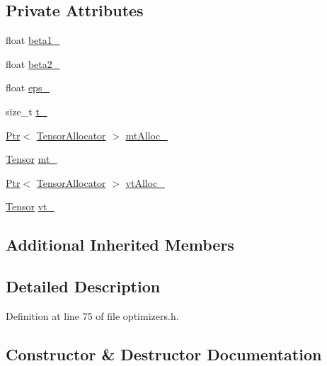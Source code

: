 \subsection*{Private Attributes}
\begin{DoxyCompactItemize}
\item 
float \hyperlink{classmarian_1_1Adam_af3fd471705356247190b1bb4479b8caa}{beta1\+\_\+}
\item 
float \hyperlink{classmarian_1_1Adam_ab9500202203fe54509a1dd1af86f8e22}{beta2\+\_\+}
\item 
float \hyperlink{classmarian_1_1Adam_a95c21e42ab91a2b6631702a470a1af81}{eps\+\_\+}
\item 
size\+\_\+t \hyperlink{classmarian_1_1Adam_ad51e47f4b687f5df04dedb1222559e9d}{t\+\_\+}
\item 
\hyperlink{namespacemarian_ad1a373be43a00ef9ce35666145137b08}{Ptr}$<$ \hyperlink{classmarian_1_1TensorAllocator}{Tensor\+Allocator} $>$ \hyperlink{classmarian_1_1Adam_a148b6411057a10ca625e4cff3c9f893c}{mt\+Alloc\+\_\+}
\item 
\hyperlink{namespacemarian_a88b71ec34bb354564cddc24eb80f7e14}{Tensor} \hyperlink{classmarian_1_1Adam_a5af2c6b526ebd34160a6c253ff03ac75}{mt\+\_\+}
\item 
\hyperlink{namespacemarian_ad1a373be43a00ef9ce35666145137b08}{Ptr}$<$ \hyperlink{classmarian_1_1TensorAllocator}{Tensor\+Allocator} $>$ \hyperlink{classmarian_1_1Adam_a81c15958e30a106cf010d3b6e76f3b19}{vt\+Alloc\+\_\+}
\item 
\hyperlink{namespacemarian_a88b71ec34bb354564cddc24eb80f7e14}{Tensor} \hyperlink{classmarian_1_1Adam_a5c819b181f362b33c738d4ffc632c5b4}{vt\+\_\+}
\end{DoxyCompactItemize}
\subsection*{Additional Inherited Members}


\subsection{Detailed Description}


Definition at line 75 of file optimizers.\+h.



\subsection{Constructor \& Destructor Documentation}
